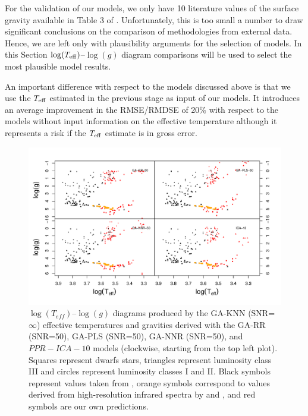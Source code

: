 For the validation of our models, we only have 10 literature values of
the surface gravity available in Table 3 of
\cite{cesetti}. Unfortunately, this is too small a number to draw
significant conclusions on the comparison of methodologies from
external data. Hence, we are left only with plausibility arguments for
the selection of models. In this Section $\log(T_{\rm
eff})$--$\log(g)$ diagram comparisons will be used to select the most
plausible model results.

An important difference with respect to the models discussed
above is that we use the $T_{\rm eff}$ estimated in the previous stage
as input of our models. It introduces an average improvement in the
RMSE/RMDSE of 20\% with respect to the models without input
information on the effective temperature although it represents a risk
if the $T_{\rm eff}$ estimate is in gross error.

\begin{figure}[!htbp]
 \begin{center}
   \includegraphics[width=\textwidth]{figs/ordieres-fig4}
\caption{$\log(T_{eff})$--$\log(g)$ diagrams produced by the GA-KNN
   (SNR=$\infty$) effective temperatures and gravities derived with
   the GA-RR (SNR=50), GA-PLS (SNR=50), GA-NNR (SNR=50), and
   $PPR-ICA-10$ models (clockwise, starting from the top left
   plot). Squares represent dwarfs stars, triangles represent
   luminosity class {\sc III} and circles represent luminosity classes
   {\sc I} and {\sc II}. Black symbols represent values taken
   from \protect\cite{cesetti}, orange symbols correspond to values
   derived from high-resolution infrared spectra by \protect\cite{esm1}
   and \protect\cite{esm2}, and red symbols are our own predictions.}

\label{fig:lt_lg_ga}
 \end{center}
\end{figure}

